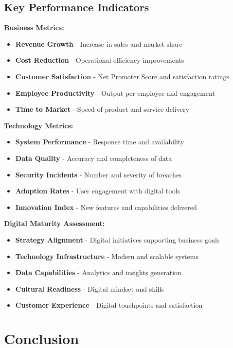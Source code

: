 \documentclass[12pt]{article}
\begin{document}
\subsection{Key Performance Indicators}

\textbf{Business Metrics:}
\begin{itemize}
    \item \textbf{Revenue Growth} - Increase in sales and market share
    \item \textbf{Cost Reduction} - Operational efficiency improvements
    \item \textbf{Customer Satisfaction} - Net Promoter Score and satisfaction ratings
    \item \textbf{Employee Productivity} - Output per employee and engagement
    \item \textbf{Time to Market} - Speed of product and service delivery
\end{itemize}

\textbf{Technology Metrics:}
\begin{itemize}
    \item \textbf{System Performance} - Response time and availability
    \item \textbf{Data Quality} - Accuracy and completeness of data
    \item \textbf{Security Incidents} - Number and severity of breaches
    \item \textbf{Adoption Rates} - User engagement with digital tools
    \item \textbf{Innovation Index} - New features and capabilities delivered
\end{itemize}

\textbf{Digital Maturity Assessment:}
\begin{itemize}
    \item \textbf{Strategy Alignment} - Digital initiatives supporting business goals
    \item \textbf{Technology Infrastructure} - Modern and scalable systems
    \item \textbf{Data Capabilities} - Analytics and insights generation
    \item \textbf{Cultural Readiness} - Digital mindset and skills
    \item \textbf{Customer Experience} - Digital touchpoints and satisfaction
\end{itemize}

\section{Conclusion}
\end{document}
